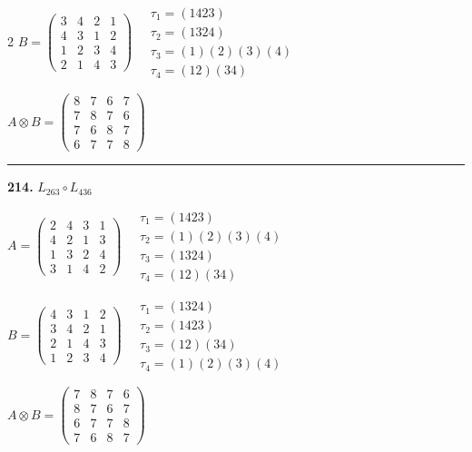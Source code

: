 \begin{multicols}{2}
$B = \begin{pmatrix} 3 & 4 & 2 & 1 \\ 4 & 3 & 1 & 2 \\ 1 & 2 & 3 & 4 \\ 2 & 1 & 4 & 3 \end{pmatrix} \quad \begin{matrix} \tau_{1}=(1 4 2 3) \\ \tau_{2}=(1 3 2 4) \\ \tau_{3}=(1)(2)(3)(4) \\ \tau_{4}=(1 2)(3 4) \end{matrix}$

$A \otimes B = \begin{pmatrix} 8 & 7 & 6 & 7 \\ 7 & 8 & 7 & 6 \\ 7 & 6 & 8 & 7 \\ 6 & 7 & 7 & 8 \end{pmatrix}$

\vspace{0.3em}
\hrule
\vspace{0.3em}

\noindent\textbf{214.} $L_{263} \circ L_{436}$

$A = \begin{pmatrix} 2 & 4 & 3 & 1 \\ 4 & 2 & 1 & 3 \\ 1 & 3 & 2 & 4 \\ 3 & 1 & 4 & 2 \end{pmatrix} \quad \begin{matrix} \tau_{1}=(1 4 2 3) \\ \tau_{2}=(1)(2)(3)(4) \\ \tau_{3}=(1 3 2 4) \\ \tau_{4}=(1 2)(3 4) \end{matrix}$

$B = \begin{pmatrix} 4 & 3 & 1 & 2 \\ 3 & 4 & 2 & 1 \\ 2 & 1 & 4 & 3 \\ 1 & 2 & 3 & 4 \end{pmatrix} \quad \begin{matrix} \tau_{1}=(1 3 2 4) \\ \tau_{2}=(1 4 2 3) \\ \tau_{3}=(1 2)(3 4) \\ \tau_{4}=(1)(2)(3)(4) \end{matrix}$

$A \otimes B = \begin{pmatrix} 7 & 8 & 7 & 6 \\ 8 & 7 & 6 & 7 \\ 6 & 7 & 7 & 8 \\ 7 & 6 & 8 & 7 \end{pmatrix}$


\end{multicols}
